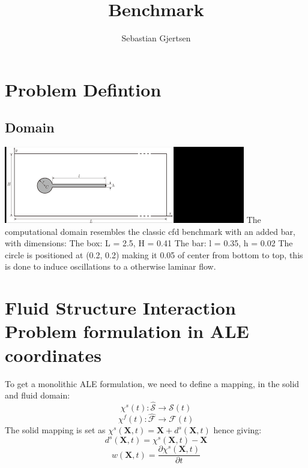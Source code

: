 
\usepackage{amsmath}                                    
\title{Benchmark}
\author{Sebastian Gjertsen}

\maketitle
\section*{Problem Defintion}
\subsection*{Domain}
\includegraphics[scale=0.9]{geometry.png}
The computational domain resembles the classic cfd benchmark with an added bar, with dimensions:
The box: L = 2.5, H = 0.41
The bar: l = 0.35, h = 0.02
The circle is positioned at (0.2, 0.2) making it 0.05 of center from bottom to top, this is done to induce oscillations to a otherwise laminar flow.

\section*{Fluid Structure Interaction Problem formulation in ALE coordinates}
To get a monolithic ALE formulation, we need to define a mapping, in the solid and fluid domain:
$$  \chi^s(t) : \hat{\mathcal{S}} \rightarrow \mathcal{S}(t)     $$ 
$$  \chi^f(t) : \hat{\mathcal{F}} \rightarrow \mathcal{F}(t)     $$ 
The solid mapping is set as $\chi^s(\textbf{X},t) = \textbf{X}  + d^s(\textbf{X} ,t)$
hence giving:
$$  d^s(\textbf{X},t) = \chi^s(\textbf{X},t) -\textbf{X}   $$
$$  w(\textbf{X},t) = \frac{\partial \chi^s(\textbf{X},t)}{\partial t}   $$

